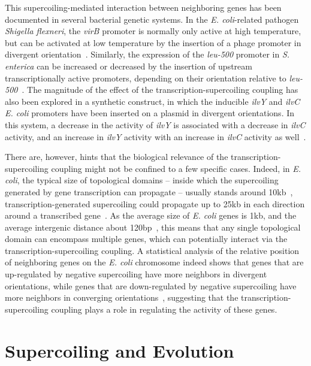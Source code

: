 This supercoiling-mediated interaction between neighboring genes has been documented in several bacterial genetic systems.
In the \emph{E. coli}-related pathogen \emph{Shigella flexneri}, the \emph{virB} promoter is normally only active at high temperature, but can be activated at low temperature by the insertion of a phage promoter in divergent orientation~\citep{tobe1995}.
Similarly, the expression of the \emph{leu-500} promoter in \emph{S. enterica} can be increased or decreased by the insertion of upstream transcriptionally active promoters, depending on their orientation relative to \emph{leu-500}~\citep{elhanafi2000}.
The magnitude of the effect of the transcription-supercoiling coupling has also been explored in a synthetic construct, in which the inducible \emph{ilvY} and \emph{ilvC} \emph{E. coli} promoters have been inserted on a plasmid in divergent orientations.
In this system, a decrease in the activity of \emph{ilvY} is associated with a decrease in \emph{ilvC} activity, and an increase in \emph{ilvY} activity with an increase in \emph{ilvC} activity as well~\citep{rhee1999}.

There are, however, hints that the biological relevance of the transcription-supercoiling coupling might not be confined to a few specific cases.
Indeed, in \emph{E. coli}, the typical size of topological domains --  inside which the supercoiling generated by gene transcription can propagate -- usually stands around 10kb~\citep{postow2004}, transcription-generated supercoiling could propagate up to 25kb in each direction around a transcribed gene~\citep{visser2022}.
As the average size of \emph{E. coli} genes is 1kb, and the average intergenic distance about 120bp~\citep{blattner1997}, this means that any single topological domain can encompass multiple genes, which can potentially interact via the transcription-supercoiling coupling.
A statistical analysis of the relative position of neighboring genes on the \emph{E. coli} chromosome indeed shows that genes that are up-regulated by negative supercoiling have more neighbors in divergent orientations, while genes that are down-regulated by negative supercoiling have more neighbors in converging orientations~\citep{sobetzko2016}, suggesting that the transcription-supercoiling coupling plays a role in regulating the activity of these genes.

\section{Supercoiling and Evolution}


